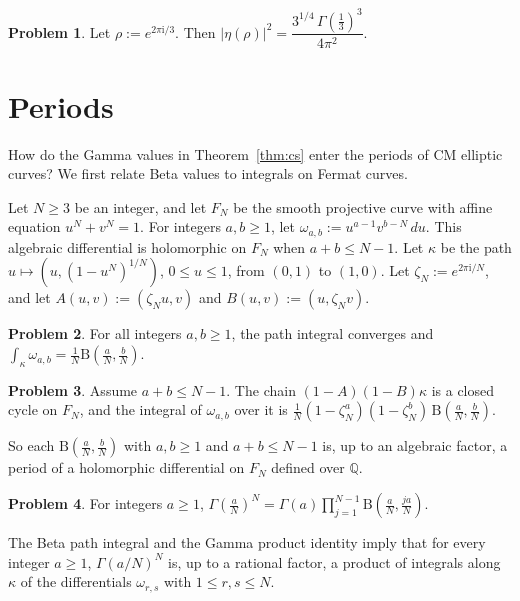 \documentclass[reqno]{amsart}
\theoremstyle{definition}
\newtheorem{problem}{Problem}[section]
\theoremstyle{plain}
\newcommand{\Q}{\mathbb{Q}}
\newcommand{\ii}{\mathrm{i}}
\newcommand{\Beta}{\mathrm{B}}
\begin{document}
\begin{problem}\label{pr:eta-rho}
Let \(\rho := e^{2\pi\ii/3}\).  Then \(\lvert\eta(\rho)\rvert^2 = \dfrac{3^{1/4}\,\Gamma(\frac13)^3}{4\pi^2}\).
\end{problem}

\section{Periods}\label{sec:periods}

How do the Gamma values in Theorem~\ref{thm:cs} enter the periods of CM elliptic curves?  We first relate Beta values to integrals on Fermat curves.

Let \(N \ge 3\) be an integer, and let \(F_N\) be the smooth projective curve with affine equation \(u^N + v^N = 1\).  For integers \(a,b\ge1\), let \(\omega_{a,b}:=u^{a-1}v^{b-N}\,d u\).  This algebraic differential is holomorphic on \(F_N\) when \(a+b\le N-1\).  Let \(\kappa\) be the path \(u \mapsto (u, (1 - u^N)^{1/N})\), \(0 \le u \le 1\), from \((0,1)\) to \((1,0)\).  Let \(\zeta_N := e^{2\pi\ii/N}\), and let \(A(u,v) := (\zeta_N u, v)\) and \(B(u,v) := (u, \zeta_N v)\).

\begin{problem}\label{pr:beta-path}
For all integers \(a,b\ge1\), the path integral converges and \(\int_\kappa\omega_{a,b}=\frac1N\Beta(\frac aN,\frac bN)\).
\end{problem}

\begin{problem}\label{pr:cycle}
Assume \(a+b\le N-1\).  The chain \((1 - A)(1 - B)\kappa\) is a closed cycle on \(F_N\), and the integral of \(\omega_{a,b}\) over it is \(\frac1N (1 - \zeta_N^a)(1 - \zeta_N^b)\, \Beta(\frac aN, \frac bN)\).
\end{problem}

So each \(\Beta(\frac aN, \frac bN)\) with \(a, b \ge 1\) and \(a + b \le N - 1\) is, up to an algebraic factor, a period of a holomorphic differential on \(F_N\) defined over \(\Q\).

\begin{problem}\label{pr:gamma-N}
For integers \(a \ge 1\), \(\Gamma(\frac aN)^N = \Gamma(a) \prod_{j=1}^{N-1} \Beta(\frac aN, \frac{ja}N)\).
\end{problem}

The Beta path integral and the Gamma product identity imply that for every integer \(a\ge1\), \(\Gamma(a/N)^N\) is, up to a rational factor, a product of integrals along \(\kappa\) of the differentials \(\omega_{r,s}\) with \(1\le r,s\le N\).
\end{document}
